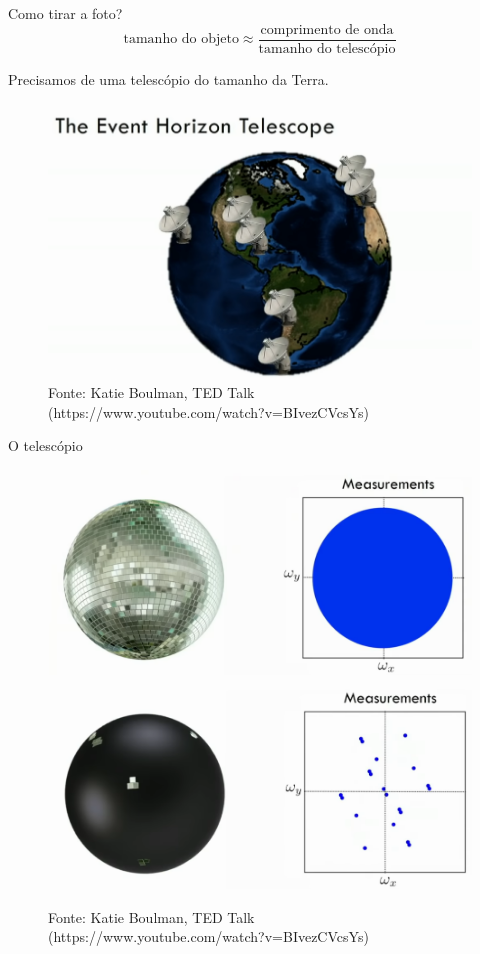 \documentclass{beamer}
\begin{document}
\begin{frame}{Como tirar a foto?}
    \[\text{tamanho do objeto} \approx \displaystyle\frac{\text{comprimento de
    onda}}{\text{tamanho do telesc\'opio}}\]
    \begin{center}
        Precisamos de uma telesc\'opio do tamanho da Terra.
    \end{center}
    \pause{}
    \begin{figure}
        \includegraphics[scale=0.25]{figs/telescopios.png}
        \caption{Fonte: Katie Boulman, TED
        Talk (https://www.youtube.com/watch?v=BIvezCVcsYs)}
    \end{figure}
\end{frame}

\begin{frame}{O telesc\'opio}
    \begin{figure}
        \includegraphics[scale=0.2]{figs/disco-ball1.png} \\
        \includegraphics[scale=0.2]{figs/disco-ball2.png}
        \caption{Fonte: Katie Boulman, TED
        Talk (https://www.youtube.com/watch?v=BIvezCVcsYs)}
    \end{figure}
\end{frame}
\end{document}
